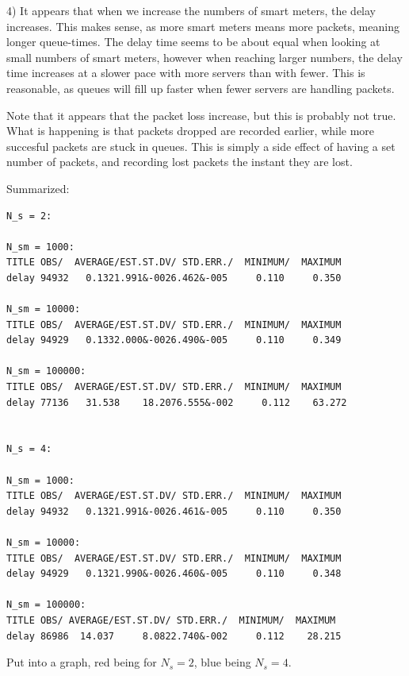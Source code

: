 \documentclass[11pt]{article}
\begin{document}
4) It appears that when we increase the numbers of smart meters, the delay increases. This makes sense, as more smart meters means more packets, meaning longer queue-times. The delay time seems to be about equal when looking at small numbers of smart meters, however when reaching larger numbers, the delay time increases at a slower pace with more servers than with fewer. This is reasonable, as queues will fill up faster when fewer servers are handling packets.

Note that it appears that the packet loss increase, but this is probably not true. What is happening is that packets dropped are recorded earlier, while more succesful packets are stuck in queues. This is simply a side effect of having a set number of packets, and recording lost packets the instant they are lost.

Summarized:

\begin{lstlisting}
N_s = 2:

N_sm = 1000:
TITLE OBS/  AVERAGE/EST.ST.DV/ STD.ERR./  MINIMUM/  MAXIMUM
delay 94932   0.1321.991&-0026.462&-005     0.110     0.350

N_sm = 10000:
TITLE OBS/  AVERAGE/EST.ST.DV/ STD.ERR./  MINIMUM/  MAXIMUM
delay 94929   0.1332.000&-0026.490&-005     0.110     0.349

N_sm = 100000:
TITLE OBS/  AVERAGE/EST.ST.DV/ STD.ERR./  MINIMUM/  MAXIMUM
delay 77136   31.538    18.2076.555&-002     0.112    63.272


N_s = 4:

N_sm = 1000:
TITLE OBS/  AVERAGE/EST.ST.DV/ STD.ERR./  MINIMUM/  MAXIMUM
delay 94932   0.1321.991&-0026.461&-005     0.110     0.350

N_sm = 10000:
TITLE OBS/  AVERAGE/EST.ST.DV/ STD.ERR./  MINIMUM/  MAXIMUM
delay 94929   0.1321.990&-0026.460&-005     0.110     0.348

N_sm = 100000:
TITLE OBS/ AVERAGE/EST.ST.DV/ STD.ERR./  MINIMUM/  MAXIMUM
delay 86986  14.037     8.0822.740&-002     0.112    28.215

\end{lstlisting}

Put into a graph, red being for $N_s = 2$, blue being $N_s = 4$.

\begin{figure}[H]
\begin{center}
\end{center}
\end{figure}
\end{document}
